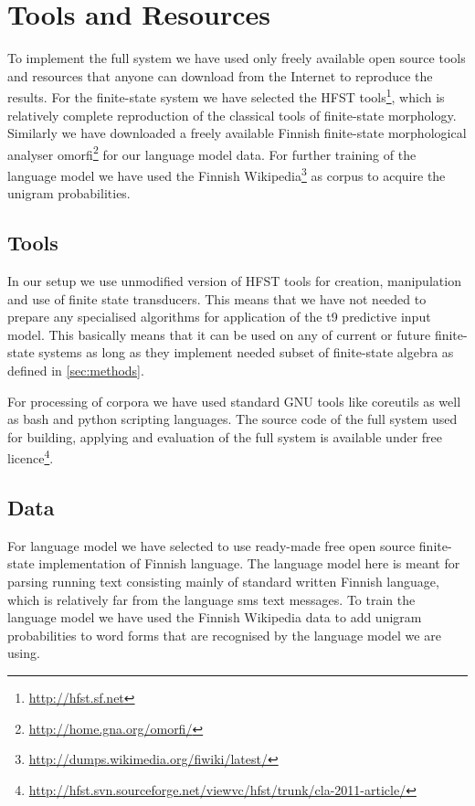\documentclass[a4paper,conference]{IEEEtran}
\begin{document}
\section{Tools and Resources}
\label{sec:tools}

To implement the full system we have used only freely available open source
tools and resources that anyone can download from the Internet to reproduce the
results. For the finite-state system we have selected the HFST
tools\footnote{\url{http://hfst.sf.net}}, which is relatively complete
reproduction of the classical tools of finite-state
morphology\cite{beesley/2003}. Similarly we have downloaded a freely available
Finnish finite-state morphological analyser
omorfi\footnote{\url{http://home.gna.org/omorfi/}} for our language model
data\cite{pirinen/2011/nodalida}. For further training of the language model we
have used the Finnish
Wikipedia\footnote{\url{http://dumps.wikimedia.org/fiwiki/latest/}} as corpus
to acquire the unigram probabilities\cite{pirinen/2010/lrec}.

\subsection{Tools}

In our setup we use unmodified version of HFST tools for creation, manipulation
and use of finite state transducers\cite{hfst/2011}. This means that we have
not needed to prepare any specialised algorithms for application of the t9
predictive input model. This basically means that it can be used on any of
current or future finite-state systems as long as they implement needed subset
of finite-state algebra as defined in \ref{sec:methods}.

For processing of corpora we have used standard GNU tools like coreutils as
well as bash and python scripting languages. The source code of the full system
used for building, applying and evaluation of the full system is available
under free
licence\footnote{\url{http://hfst.svn.sourceforge.net/viewvc/hfst/trunk/cla-2011-article/}}.

\subsection{Data}
\label{sec:data}

For language model we have selected to use ready-made free open source
finite-state implementation of Finnish language\cite{pirinen/2011/nodalida}.
The language model here is meant for parsing running text consisting mainly of
standard written Finnish language, which is relatively far from the language
sms text messages.  To train the language model we have used
the Finnish Wikipedia data to add unigram probabilities to word forms that are
recognised by the language model we are using. 
\end{document}
